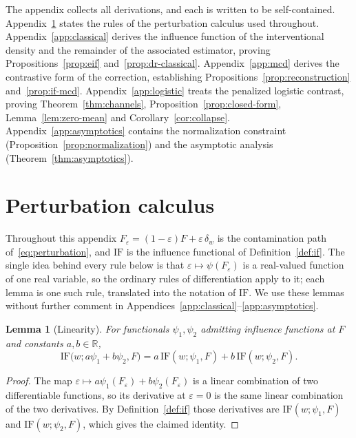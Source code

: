 \documentclass[11pt]{article}
\theoremstyle{plain}
\newtheorem{lem}{Lemma}
\theoremstyle{definition}
\theoremstyle{remark}
\newcommand{\R}{\mathbb{R}}
\newcommand{\IF}{\mathrm{IF}}
\begin{document}
The appendix collects all derivations, and each is written to be self-contained.
Appendix~\ref{app:toolbox} states the rules of the perturbation calculus used throughout.
Appendix~\ref{app:classical} derives the influence function of the interventional density and
the remainder of the associated estimator, proving Propositions~\ref{prop:eif}
and~\ref{prop:dr-classical}. Appendix~\ref{app:mcd} derives the contrastive form of the
correction, establishing Propositions~\ref{prop:reconstruction} and~\ref{prop:if-mcd}.
Appendix~\ref{app:logistic} treats the penalized logistic contrast, proving
Theorem~\ref{thm:channels}, Proposition~\ref{prop:closed-form}, Lemma~\ref{lem:zero-mean} and
Corollary~\ref{cor:collapse}. Appendix~\ref{app:asymptotics} contains the normalization
constraint (Proposition~\ref{prop:normalization}) and the asymptotic analysis
(Theorem~\ref{thm:asymptotics}).

\section{Perturbation calculus}
\label{app:toolbox}

Throughout this appendix $F_\varepsilon = (1-\varepsilon)F + \varepsilon\,\delta_w$ is the
contamination path of~\eqref{eq:perturbation}, and $\IF$ is the influence functional of
Definition~\ref{def:if}. The single idea behind every rule below is that
$\varepsilon \mapsto \psi(F_\varepsilon)$ is a real-valued function of one real variable, so
the ordinary rules of differentiation apply to it; each lemma is one such rule, translated into
the notation of $\IF$. We use these lemmas without further comment in
Appendices~\ref{app:classical}--\ref{app:asymptotics}.

\begin{lem}[Linearity]
\label{lem:sum}
For functionals $\psi_1,\psi_2$ admitting influence functions at $F$ and constants
$a,b \in \R$,
\[
\IF\big(w; a\psi_1 + b\psi_2, F\big)
= a\,\IF(w;\psi_1,F) + b\,\IF(w;\psi_2,F).
\]
\end{lem}
\begin{proof}
The map $\varepsilon \mapsto a\psi_1(F_\varepsilon) + b\psi_2(F_\varepsilon)$ is a linear
combination of two differentiable functions, so its derivative at $\varepsilon = 0$ is the
same linear combination of the two derivatives. By Definition~\ref{def:if} those derivatives
are $\IF(w;\psi_1,F)$ and $\IF(w;\psi_2,F)$, which gives the claimed identity.
\end{proof}
\end{document}
